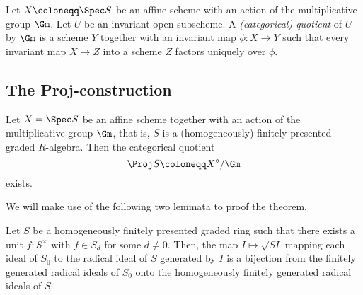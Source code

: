 \begin{definition}
  Let $X \coloneqq \Spec S$ be an affine scheme with an action of the
  multiplicative group $\Gm$.  Let $U$ be an invariant open subscheme.
  A \emph{(categorical) quotient} of $U$ by $\Gm$ is a scheme $Y$
  together with an invariant map $\phi : X \to Y$ such that
  every invariant map $X \to Z$ into a scheme $Z$ factors uniquely
  over $\phi$.
\end{definition}

\subsection{The Proj-construction}

\begin{theorem}\label{proj construction}
  Let $X = \Spec S$ be an affine scheme together with an action of the
  multiplicative group $\Gm$, that is, $S$ is a (homogeneously)
  finitely presented graded $R$-algebra.  Then the categorical
  quotient
  \begin{equation*}
    \Proj S \coloneqq X^\circ/\Gm
  \end{equation*}
  exists.
\end{theorem}

We will make use of the following two lemmata to proof the theorem.

\begin{lemma}\label{proj construction lemma 1}
  Let $S$ be a homogeneously finitely presented graded ring such that
  there exists a unit $f\colon S^\times$ with $f \in S_d$ for some $d \neq
  0$.  Then, the map $I \mapsto \sqrt{SI}$ mapping each ideal of $S_0$
  to the radical ideal of $S$ generated by $I$ is a bijection from
  the finitely generated radical ideals of $S_0$ onto the homogeneously finitely
  generated radical ideals of $S$.
\end{lemma}

